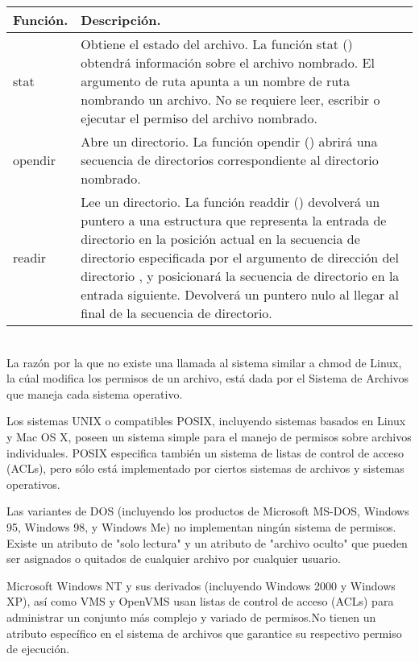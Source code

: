 \documentclass[12pt]{article}
\begin{document}
			 \begin{tabular}{
			|p{5cm}|p{10cm}||}
			\hline
			\textbf{ Función.} & \textbf{ Descripción.}\\ 
			\hline
			\hline stat & Obtiene el estado del archivo. La función stat () obtendrá información sobre el archivo nombrado. El argumento de ruta apunta a un nombre de ruta nombrando un archivo. No se requiere leer, escribir o ejecutar el permiso del archivo nombrado.
			\\
			\hline opendir& Abre un directorio. La función opendir () abrirá una secuencia de directorios correspondiente al directorio nombrado. \\
			\hline readir & Lee un directorio.  La función readdir () devolverá un puntero a una estructura que representa la entrada de directorio en la posición actual en la secuencia de directorio especificada por el argumento de dirección del directorio , y posicionará la secuencia de directorio en la entrada siguiente. Devolverá un puntero nulo al llegar al final de la secuencia de directorio. \\
			\hline 
			\end{tabular}\\
			
			La razón por la que no existe una llamada al sistema similar a chmod de Linux, la cúal modifica los permisos de un archivo, está dada por el Sistema de Archivos que maneja cada sistema operativo.
			
			Los sistemas UNIX o compatibles POSIX, incluyendo sistemas basados en Linux y Mac OS X, poseen un sistema simple para el manejo de permisos sobre archivos individuales. POSIX especifica también un sistema de listas de control de acceso (ACLs), pero sólo está implementado por ciertos sistemas de archivos y sistemas operativos. 
			
			Las variantes de DOS (incluyendo los productos de Microsoft MS-DOS, Windows 95, Windows 98, y Windows Me) no implementan ningún sistema de permisos. Existe un atributo de "solo lectura" y un atributo de "archivo oculto" que pueden ser asignados o quitados de cualquier archivo por cualquier usuario.
			
			Microsoft Windows NT y sus derivados (incluyendo Windows 2000 y Windows XP), así como VMS y OpenVMS usan listas de control de acceso (ACLs) para administrar un conjunto más complejo y variado de permisos.No tienen un atributo específico en el sistema de archivos que garantice su respectivo permiso de ejecución.
			
\newpage
\end{document}
